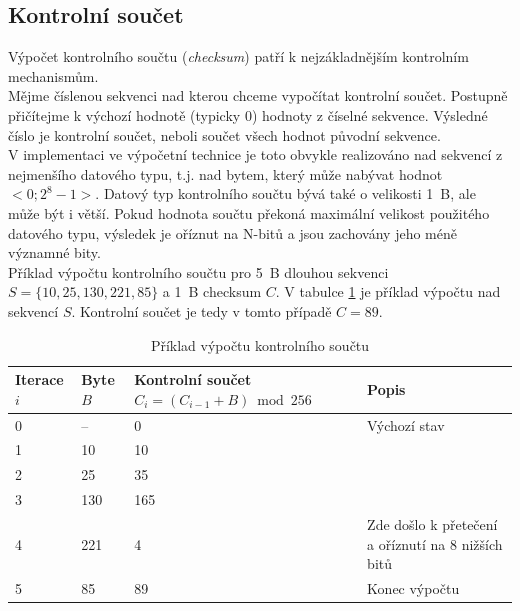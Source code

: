 \subsection{Kontrolní součet}
\label{subsec:checksum}
Výpočet kontrolního součtu (\textit{checksum}) patří k nejzákladnějším kontrolním mechanismům.\\
Mějme číslenou sekvenci nad kterou chceme vypočítat kontrolní součet. Postupně přičítejme k výchozí hodnotě (typicky 0) hodnoty z číselné sekvence. Výsledné číslo je kontrolní součet, neboli součet všech hodnot původní sekvence.\\
V implementaci ve výpočetní technice je toto obvykle realizováno nad sekvencí z nejmenšího datového typu, t.j. nad bytem, který může nabývat hodnot $<0;2^{8}-1>$. Datový typ kontrolního součtu bývá také o velikosti 1~B, ale může být i větší. Pokud hodnota součtu překoná maximální velikost použitého datového typu, výsledek je oříznut na N-bitů a jsou zachovány jeho méně významné bity.\\
Příklad výpočtu kontrolního součtu pro 5~B dlouhou sekvenci $S=\{10, 25, 130, 221, 85\}$ a 1~B checksum $C$.
V tabulce \ref{tab:checksum-example} je příklad výpočtu nad sekvencí $S$. Kontrolní součet je tedy v tomto případě $C=89$.
\begin{table}[h]
    \centering
    \begin{tabular}{ | l | l | l | l | }
        \hline
        Iterace $i$ & Byte $B$  & \makecell{Kontrolní součet\\$C_{i}=(C_{i-1}+B) \bmod 256$}  & Popis \\ \hline\hline
        0           & --        & 0                                 & Výchozí stav \\ \hline
        1           & 10        & 10                                & \\\hline
        2           & 25        & 35                                & \\\hline
        3           & 130       & 165                               & \\\hline
        4           & 221       & 4                                 & Zde došlo k přetečení a oříznutí na 8 nižších bitů \\\hline
        5           & 85        & 89                                & Konec výpočtu \\\hline
    \end{tabular}
    \label{tab:checksum-example}
    \caption{Příklad výpočtu kontrolního součtu}
\end{table}

